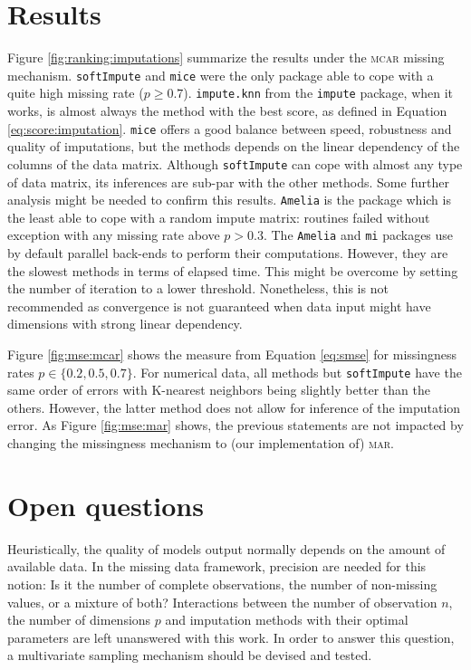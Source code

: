 \section{Results}

Figure \ref{fig:ranking:imputations} summarize the results under the
\textsc{mcar} missing mechanism. \texttt{softImpute} and \texttt{mice} were the
only package able to cope with a quite high missing rate ($p \geq
0.7$). \texttt{impute.knn} from the \texttt{impute} package, when it works, is
almost always the method with the best score, as defined in Equation
\eqref{eq:score:imputation}. \texttt{mice} offers a good balance between speed,
robustness and quality of imputations, but the methods depends on the linear
dependency of the columns of the data matrix. Although \texttt{softImpute} can
cope with almost any type of data matrix, its inferences are sub-par with the
other methods. Some further analysis might be needed to confirm this
results. \texttt{Amelia} is the package which is the least able to cope with a
random impute matrix: routines failed without exception with any missing rate
above $p > 0.3$. The \texttt{Amelia} and \texttt{mi} packages use by default
parallel back-ends to perform their computations. However, they are the slowest
methods in terms of elapsed time. This might be overcome by setting the number
of iteration to a lower threshold. Nonetheless, this is not recommended as
convergence is not guaranteed when data input might have dimensions with strong
linear dependency.

Figure \ref{fig:mse:mcar} shows the measure from Equation \eqref{eq:smse} for
missingness rates $p \in \{0.2, 0.5, 0.7\}$. For numerical data, all methods
but \texttt{softImpute} have the same order of errors with K-nearest neighbors
being slightly better than the others. However, the latter method does not
allow for inference of the imputation error.  As Figure \ref{fig:mse:mar}
shows, the previous statements are not impacted by changing the missingness
mechanism to (our implementation of) \textsc{mar}.

\section{Open questions}

Heuristically, the quality of models output normally depends on the amount of
available data. In the missing data framework, precision are needed for this
notion: Is it the number of complete observations, the number of non-missing
values, or a mixture of both?  Interactions between the number of observation
$n$, the number of dimensions $p$ and imputation methods with their optimal
parameters are left unanswered with this work. In order to answer this
question, a multivariate sampling mechanism should be devised and tested.

